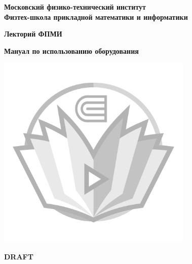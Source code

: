 \begin{titlepage}
  \clearpage\thispagestyle{empty}
  \centering

  \textbf{Московский физико-технический институт \\ Физтех-школа прикладной математики и информатики}

  \vspace{10ex}

  {\textbf{Лекторий ФПМИ}}

  \vspace{10ex}

  {\textbf{Мануал по использованию оборудования}}

  \vspace{10ex}
  
  \includegraphics[width=0.7\textwidth]{Images/watermark.png}

  \begin{flushright}
  \end{flushright}


  \ifdraft    %
    \begin{tcolorbox}
      \centering
      \bfseries\Huge{DRAFT}
    \end{tcolorbox}
  \else
  \fi

  \vfill
  \displayAutoLastUpdatedDate

  \pagebreak
\end{titlepage}
